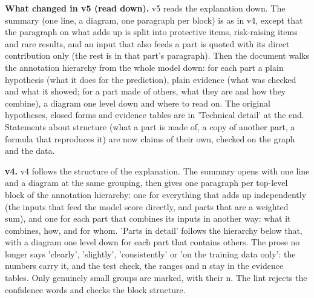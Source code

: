 \documentclass[a4paper,10pt]{article}
\begin{document}
\par\medskip\noindent\textbf{What changed in v5 (read down).} v5 reads the explanation down. The summary (one line, a diagram, one paragraph per block) is as in v4, except that the paragraph on what adds up is split into protective items, risk-raising items and rare results, and an input that also feeds a part is quoted with its direct contribution only (the rest is in that part's paragraph). Then the document walks the annotation hierarchy from the whole model down: for each part a plain hypothesis (what it does for the prediction), plain evidence (what was checked and what it showed; for a part made of others, what they are and how they combine), a diagram one level down and where to read on. The original hypotheses, closed forms and evidence tables are in 'Technical detail' at the end. Statements about structure (what a part is made of, a copy of another part, a formula that reproduces it) are now claims of their own, checked on the graph and the data.
\par\medskip\noindent\textbf{v4.} v4 follows the structure of the explanation. The summary opens with one line and a diagram at the same grouping, then gives one paragraph per top-level block of the annotation hierarchy: one for everything that adds up independently (the inputs that feed the model score directly, and parts that are a weighted sum), and one for each part that combines its inputs in another way: what it combines, how, and for whom. 'Parts in detail' follows the hierarchy below that, with a diagram one level down for each part that contains others. The prose no longer says 'clearly', 'slightly', 'consistently' or 'on the training data only': the numbers carry it, and the test check, the ranges and n stay in the evidence tables. Only genuinely small groups are marked, with their n. The lint rejects the confidence words and checks the block structure.
\tableofcontents
\listoffigures
\clearpage
\end{document}
